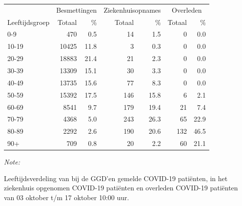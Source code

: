 \documentclass[
  english,
  man,floatsintext]{apa6}
\begin{document}
\begin{table}[H]
\centering\begingroup\fontsize{11}{13}\selectfont

\begin{threeparttable}
\begin{tabular}{lrrrrrr}
\toprule
\multicolumn{1}{c}{ } & \multicolumn{2}{c}{Besmettingen} & \multicolumn{2}{c}{Ziekenhuisopnames} & \multicolumn{2}{c}{Overleden} \\
\cmidrule(l{3pt}r{3pt}){2-3} \cmidrule(l{3pt}r{3pt}){4-5} \cmidrule(l{3pt}r{3pt}){6-7}
Leeftijdsgroep & Totaal & \% & Totaal & \% & Totaal & \%\\
\midrule
0-9 & 470 & 0.5 & 14 & 1.5 & 0 & 0.0\\
10-19 & 10425 & 11.8 & 3 & 0.3 & 0 & 0.0\\
20-29 & 18883 & 21.4 & 21 & 2.3 & 0 & 0.0\\
30-39 & 13309 & 15.1 & 30 & 3.3 & 0 & 0.0\\
40-49 & 13735 & 15.6 & 77 & 8.3 & 0 & 0.0\\
50-59 & 15392 & 17.5 & 146 & 15.8 & 6 & 2.1\\
60-69 & 8541 & 9.7 & 179 & 19.4 & 21 & 7.4\\
70-79 & 4368 & 5.0 & 243 & 26.3 & 65 & 22.9\\
80-89 & 2292 & 2.6 & 190 & 20.6 & 132 & 46.5\\
90+ & 709 & 0.8 & 20 & 2.2 & 60 & 21.1\\
\bottomrule
\end{tabular}
\begin{tablenotes}
\item \textit{Note: } 
\item Leeftijdsverdeling van bij de GGD’en gemelde COVID-19 patiënten, in het ziekenhuis opgenomen COVID-19 patiënten en overleden COVID-19 patiënten van 03 oktober t/m 17 oktober 10:00 uur.
\end{tablenotes}
\end{threeparttable}
\endgroup{}
\end{table}
\end{document}
